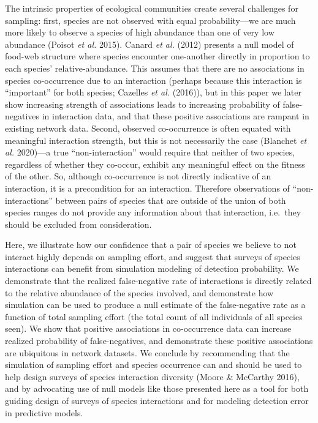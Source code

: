\documentclass[11pt]{article}
\begin{document}
The intrinsic properties of ecological communities create several
challenges for sampling: first, species are not observed with equal
probability---we are much more likely to observe a species of high
abundance than one of very low abundance (Poisot \emph{et al.} 2015).
Canard \emph{et al.} (2012) presents a null model of food-web structure
where species encounter one-another directly in proportion to each
species' relative-abundance. This assumes that there are no associations
in species co-occurrence due to an interaction (perhaps because this
interaction is ``important'' for both species; Cazelles \emph{et al.}
(2016)), but in this paper we later show increasing strength of
associations leads to increasing probability of false-negatives in
interaction data, and that these positive associations are rampant in
existing network data. Second, observed co-occurrence is often equated
with meaningful interaction strength, but this is not necessarily the
case (Blanchet \emph{et al.} 2020)---a true ``non-interaction'' would
require that neither of two species, regardless of whether they
co-occur, exhibit any meaningful effect on the fitness of the other. So,
although co-occurrence is not directly indicative of an interaction, it
is a precondition for an interaction. Therefore observations of
``non-interactions'' between pairs of species that are outside of the
union of both species ranges do not provide any information about that
interaction, i.e.~they should be excluded from consideration.

Here, we illustrate how our confidence that a pair of species we believe
to not interact highly depends on sampling effort, and suggest that
surveys of species interactions can benefit from simulation modeling of
detection probability. We demonstrate that the realized false-negative
rate of interactions is directly related to the relative abundance of
the species involved, and demonstrate how simulation can be used to
produce a null estimate of the false-negative rate as a function of
total sampling effort (the total count of all individuals of all species
seen). We show that positive associations in co-occurrence data can
increase realized probability of false-negatives, and demonstrate these
positive associations are ubiquitous in network datasets. We conclude by
recommending that the simulation of sampling effort and species
occurrence can and should be used to help design surveys of species
interaction diversity (Moore \& McCarthy 2016), and by advocating use of
null models like those presented here as a tool for both guiding design
of surveys of species interactions and for modeling detection error in
predictive models.
\end{document}
